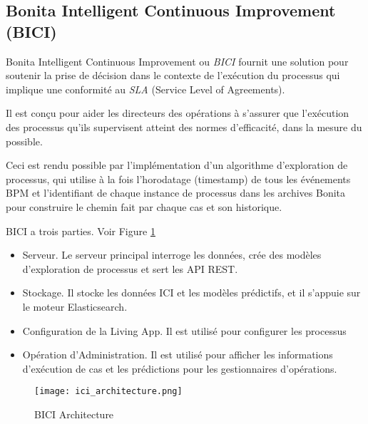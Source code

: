 \subsection{Bonita Intelligent Continuous Improvement (BICI)}


Bonita Intelligent Continuous Improvement ou \emph{BICI} fournit une solution pour soutenir la prise de décision dans le contexte de l'exécution du processus qui implique une conformité au \textit{SLA} (Service Level of Agreements).

Il est conçu pour aider les directeurs des opérations à s'assurer que l'exécution des processus qu'ils supervisent atteint des normes d'efficacité, dans la mesure du possible.

Ceci est rendu possible par l'implémentation d'un algorithme d'exploration de processus, qui utilise à la fois l’horodatage (timestamp) de tous les événements BPM et l'identifiant de chaque instance de processus dans les archives Bonita pour construire le chemin fait par chaque cas et son historique.

BICI a trois parties. Voir Figure \ref{fig:ici_architecture}
\begin{itemize}
  \item Serveur. Le serveur principal interroge les données, crée des modèles d'exploration de processus et sert les API REST.
  \item Stockage. Il stocke les données ICI et les modèles prédictifs, et il s'appuie sur le moteur Elasticsearch.
  \item Configuration de la Living App. Il est utilisé pour configurer les processus
  \item Opération d'Administration. Il est utilisé pour afficher les informations d'exécution de cas et les prédictions pour les gestionnaires d'opérations.
\end{itemize}

\begin{figure}[!ht]
\centering
\texttt{[image: ici\_architecture.png]}
\caption{BICI Architecture}
\label{fig:ici_architecture}
\end{figure}

